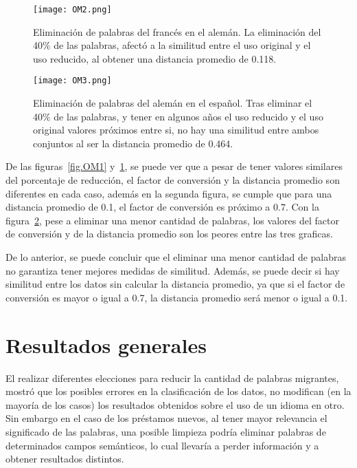 \begin{figure}[h!]
	\centering
	\texttt{[image: OM2.png]}
	\caption{Eliminación de palabras del francés en el alemán. La eliminación del 40$\%$ de las palabras, afectó a la similitud entre el uso original y el uso reducido, al obtener una distancia promedio de 0.118.}
	\label{fig.OM2}
\end{figure}

\begin{figure}[h!]
	\centering
	\texttt{[image: OM3.png]}
	\caption{Eliminación de palabras del alemán en el español. Tras eliminar el 40$\%$ de las palabras, y  tener en algunos años el uso reducido y el uso original valores próximos entre si, no hay una similitud entre ambos conjuntos al ser la distancia promedio de  0.464.}
	\label{fig.OM3}
\end{figure}


De las figuras~\ref{fig.OM1} y~\ref{fig.OM2}, se puede ver que a pesar de tener valores similares del porcentaje de reducción, el factor de conversión y la distancia promedio son diferentes en cada caso, además en la segunda figura,  se cumple que para una distancia promedio de 0.1, el factor de conversión es próximo a 0.7. Con la figura~\ref{fig.OM3}, pese a eliminar una menor cantidad de palabras, los valores del factor de conversión y de la distancia promedio son los peores entre las tres graficas. 

De lo anterior, se puede concluir que el eliminar una menor cantidad de palabras no garantiza tener mejores medidas de similitud. Además, se puede decir si hay similitud entre los datos sin calcular la distancia promedio, ya que si el factor de conversión es mayor o igual a 0.7, la distancia promedio será menor o igual a 0.1. 

\section{Resultados generales}

El realizar diferentes elecciones para reducir la cantidad de palabras migrantes, mostró que los posibles errores en la clasificación de los datos, no modifican (en la mayoría de los casos) los resultados obtenidos sobre el uso de un idioma en otro. Sin embargo en el caso de los préstamos nuevos, al tener mayor relevancia el significado de las palabras, una posible limpieza podría eliminar palabras de determinados campos semánticos, lo cual llevaría a perder información y a obtener resultados distintos. 

